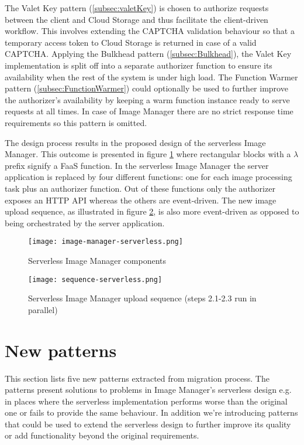 The Valet Key pattern (\ref{subsec:valetKey}) is chosen to authorize requests between the client and Cloud Storage and thus facilitate the client-driven workflow. This involves extending the CAPTCHA validation behaviour so that a temporary access token to Cloud Storage is returned in case of a valid CAPTCHA. Applying the Bulkhead pattern (\ref{subsec:Bulkhead}), the Valet Key implementation is split off into a separate authorizer function to ensure its availability when the rest of the system is under high load. The Function Warmer pattern (\ref{subsec:FunctionWarmer}) could optionally be used to further improve the authorizer's availability by keeping a warm function instance ready to serve requests at all times. In case of Image Manager there are no strict response time requirements so this pattern is omitted.

The design process results in the proposed design of the serverless Image Manager. This outcome is presented in figure \ref{fig:serverlessArchitecture} where rectangular blocks with a $\lambda$ prefix signify a FaaS function. In the serverless Image Manager the server application is replaced by four different functions: one for each image processing task plus an authorizer function. Out of these functions only the authorizer exposes an HTTP API whereas the others are event-driven. The new image upload sequence, as illustrated in figure \ref{fig:serverlessSequence}, is also more event-driven as opposed to being orchestrated by the server application.

\begin{figure}[H]
  \centering
  \texttt{[image: image-manager-serverless.png]}
  \caption{Serverless Image Manager components}
  \label{fig:serverlessArchitecture}
\end{figure}

\begin{figure}[H]
  \centering
  \texttt{[image: sequence-serverless.png]}
  \caption{Serverless Image Manager upload sequence (steps 2.1-2.3 run in parallel)}
  \label{fig:serverlessSequence}
\end{figure}

\section{New patterns} \label{sec:newPatterns}

This section lists five new patterns extracted from migration process. The patterns present solutions to problems in Image Manager's serverless design e.g. in places where the serverless implementation performs worse than the original one or fails to provide the same behaviour. In addition we're introducing patterns that could be used to extend the serverless design to further improve its quality or add functionality beyond the original requirements.

